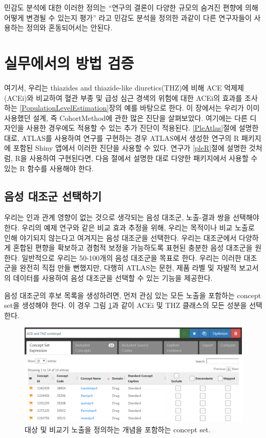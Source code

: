 \documentclass[11pt]{book}
\theoremstyle{definition}
\theoremstyle{definition}
\theoremstyle{definition}
\theoremstyle{remark}
\begin{document}
민감도 분석에 대한 이러한 정의는 ``연구의 결론이 다양한 규모의 숨겨진
편향에 의해 어떻게 변경될 수 있는지 평가'' 라고 민감도 분석을 정의한
\citet{rosenbaum_2005} 과같이 다른 연구자들이 사용하는 정의와
혼동되어서는 안된다.

\section{실무에서의 방법 검증}\label{--}

여기서, 우리는 thiazides and thiazide-like diuretics(THZ)에 비해 ACE
억제제(ACEi)와 비교하여 혈관 부종 및 급성 심근 경색의 위험에 대한 ACEi의
효과를 조사하는 \ref{PopulationLevelEstimation}장의 예를 바탕으로 한다.
이 장에서는 우리가 이미 사용했던 설계, 즉 CohortMethod에 관한 많은
진단을 살펴보았다. 여기에는 다른 디자인을 사용한 경우에도 적용할 수 있는
추가 진단이 적용된다. \ref{PleAtlas}절에 설명한 대로, ATLAS를 사용하여
연구를 구현하는 경우 ATLAS에서 생성한 연구의 R 패키지에 포함된 Shiny
앱에서 이러한 진단을 사용할 수 있다. 연구가 \ref{pleR}절에 설명한
것처럼, R을 사용하여 구현된다면, 다음 절에서 설명한 대로 다양한
패키지에서 사용할 수 있는 R 함수를 사용해야 한다.

\subsection{음성 대조군 선택하기}\label{--}

우리는 인과 관계 영향이 없는 것으로 생각되는 음성 대조군, 노출-결과 쌍을
선택해야 한다. 우리의 예제 연구와 같은 비교 효과 추정을 위해, 우리는
목적이나 비교 노출로 인해 야기되지 않는다고 여겨지는 음성 대조군을
선택한다. 우리는 대조군에서 다양하게 혼합된 편향을 확보하고 경험적
보정을 가능하도록 표현된 충분한 음성 대조군을 원한다. 일반적으로 우리는
50-100개의 음성 대조군을 목표로 한다. 우리는 이러한 대조군을 완전히 직접
만들 뻔했지만, 다행히 ATLAS는 문헌, 제품 라벨 및 자발적 보고서의
데이터를 사용하여 음성 대조군을 선택할 수 있는 기능을 제공한다.

음성 대조군의 후보 목록을 생성하려면, 먼저 관심 있는 모든 노출을
포함하는 concept set을 생성해야 한다. 이 경우 그림
\ref{fig:exposuresConceptSet}과 같이 ACEi 및 THZ 클래스의 모든 성분을
선택한다.

\begin{figure}

{\centering \includegraphics[width=1\linewidth]{images/MethodValidity/exposuresConceptSet} 

}

\caption{대상 및 비교기 노출을 정의하는 개념을 포함하는 concept set.}\label{fig:exposuresConceptSet}
\end{figure}
\end{document}

